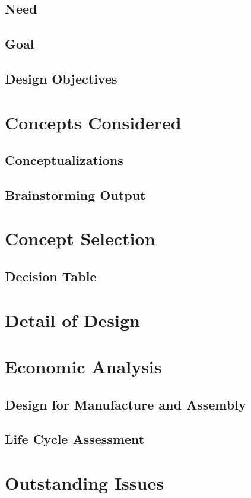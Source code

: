 \documentclass{article}
\begin{document}
\subsection{Need}

\subsection{Goal}

\subsection{Design Objectives}



\section{Concepts Considered}
\subsection{Conceptualizations}

\subsection{Brainstorming Output}


\section{Concept Selection}
\subsection{Decision Table}


\section{Detail of Design}

\section{Economic Analysis}
\subsection{Design for Manufacture and Assembly}

\subsection{Life Cycle Assessment}


\section{Outstanding Issues}
\end{document}

